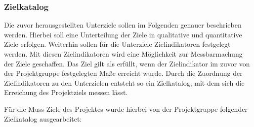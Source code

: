 \subsubsection{Zielkatalog}
\label{sec:Zielkatalog}

Die zuvor herausgestellten Unterziele sollen im Folgenden genauer beschrieben
werden. Hierbei soll eine Unterteilung der Ziele in qualitative und quantitative
Ziele erfolgen. Weiterhin sollen für die Unterziele Zielindikatoren festgelegt
werden. Mit diesen Zielindikatoren wird eine Möglichkeit zur Messbarmachung der
Ziele geschaffen. Das Ziel gilt als erfüllt, wenn der Zielindikator im zuvor von
der Projektgruppe festgelegten Maße erreicht wurde. Durch die Zuordnung der
Zielindikatoren zu den Unterzielen entsteht so ein Zielkatalog, mit dem sich
die Erreichung des Projektziels messen lässt.

Für die Muss-Ziele des Projektes wurde hierbei von der Projektgruppe folgender
Zielkatalog ausgearbeitet:



